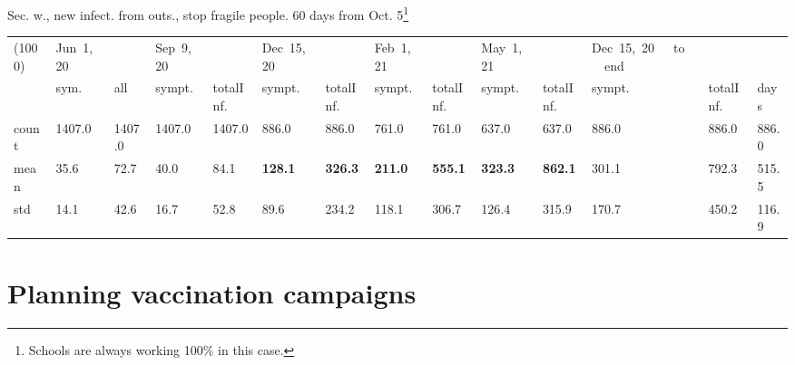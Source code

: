 \documentclass[8pt]{beamer}
\begin{document}
\begin{frame}{Sec. w., new infect. from outs., stop fragile people. 60  days from Oct. 5\footnote{Schools are always working 100\% in this case.}}
\begin{table}[H]
\center
\tiny
\begin{tabular}{p{0.3cm}p{0.3cm}p{0.3cm}p{0.3cm}p{0.3cm}p{0.3cm}p{0.3cm}p{0.3cm}p{0.3cm}p{0.3cm}p{0.3cm}p{0.3cm}p{0.3cm}p{0.4cm}}
\toprule
(1000) &  Jun~1,~20 & &  Sep~9,~20 & & Dec~15,~20 & & Feb~1,~21 & & May~1,~21 & & Dec~15,~20~~~to~~~end   \\
{} &  sym. &  all &  sympt. &  totalInf. &  sympt. &  totalInf. &  sympt. &  totalInf. &  sympt. &  totalInf. &  sympt. &  totalInf.  & days\\
\midrule
count &   1407.0 &                     1407.0 &   1407.0 &                     1407.0 &    886.0 &                      886.0 &    761.0 &                      761.0 &    637.0 &                      637.0 &              886.0 &                   886.0 &  886.0 \\
mean  &     35.6 &                       72.7 &     40.0 &                       84.1 &    \textbf{{\color{cyan}128.1}} &                      \textbf{{\color{cyan}326.3}} &    \textbf{211.0} &                      \textbf{555.1} &    \textbf{323.3} &                      \textbf{862.1} &               301.1 &                   792.3 &  515.5 \\
std   &     14.1 &                       42.6 &     16.7 &                       52.8 &     89.6 &                      234.2 &    118.1 &                      306.7 &    126.4 &                      315.9 &               170.7 &                   450.2 &  116.9 \\
\bottomrule
\end{tabular}

\label{selForceWave2NoFragTab}
\end{table}


\end{frame}





\section{Planning vaccination campaigns}
\end{document}
